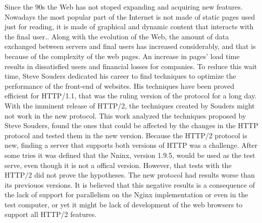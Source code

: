 %
%

\begin{resumo}[Abstract]

Since the 90s the Web has not stoped expanding and acquiring new features. Nowadays the most popular part of the Internet is not made of static pages used just for reading, it is made of graphical and dynamic content that interacts with the final user.. Along with the evolution of the Web, the amount of data exchanged between servers and final users has increased considerably, and that is because of the complexity of the web pages. An increase in pages' load time results in dissatisfied users and financial losses for companies. To reduce this wait time, Steve Souders dedicated his career to find techniques to optimize the performance of the front-end of websites. His techniques have been proved efficient for HTTP/1.1, that was the ruling version of the protocol for a long day. With the imminent release of HTTP/2, the techniques created by Souders might not work in the new protocol. This work analyzed the techniques proposed by Steve Souders, found the ones that could be affected by the changes in the HTTP protocol and tested them in the new version. Because the HTTP/2 protocol is new, finding a server that supports both versions of HTTP was a challenge. After some tries it was defined that the Nninx, version 1.9.5, would be used as the test serve, even though it is not a offical version. However, that tests with the HTTP/2 did not prove the hypotheses. The new protocol had results worse than its previouos versions. It is believed that this negative results is a consequence of the lack of support for parallelism on the Nginx implementation or even in the test computer, or yet it might be lack of development of the web browsers to support all HTTP/2 features.

\end{resumo}
